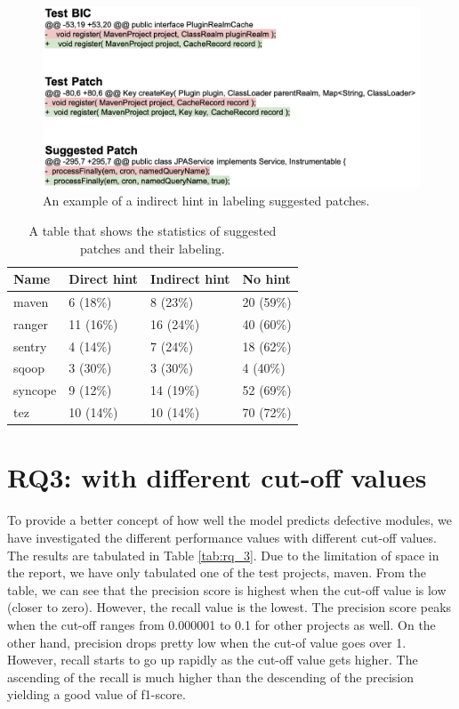 \begin{figure}[!tbp]
\renewcommand{\arraystretch}{1}
    \centering
    \includegraphics[width=\textwidth]{figures/indirect_hint.png}\hfill
    \caption{An example of a indirect hint in labeling suggested patches.}
    \label{fig:indirect_hint}
\end{figure}

\begin{table}[!htp]
\centering
\caption{A table that shows the statistics of suggested patches and their labeling.}
\begin{tabular}{|l|l|l|l|}
\hline
{Name} & {Direct hint} & {Indirect hint} & {No hint} \\ \hline
{maven} & 6 (18\%) & 8 (23\%) & 20 (59\%) \\ \hline
{ranger} & 11 (16\%) & 16 (24\%) & 40 (60\%) \\ \hline
{sentry} & 4 (14\%) & 7 (24\%) & 18 (62\%) \\ \hline
{sqoop} & 3 (30\%) & 3 (30\%) & 4 (40\%) \\ \hline
{syncope} & 9 (12\%) & 14 (19\%) & 52 (69\%) \\ \hline
{tez} & 10 (14\%) & 10 (14\%) & 70 (72\%) \\ \hline
\end{tabular}%
\label{tab:rq_2}
\end{table}


\section{RQ3: {\simfinmo} with different cut-off values}
To provide a better concept of how well the model {\simfinmo} predicts defective modules, we have investigated the different performance values with different cut-off values.
The results are tabulated in Table \ref{tab:rq_3}.
Due to the limitation of space in the report, we have only tabulated one of the test projects, maven.
From the table, we can see that the precision score is highest when the cut-off value is low (closer to zero).
However, the recall value is the lowest.
The precision score peaks when the cut-off ranges from 0.000001 to 0.1 for other projects as well.
On the other hand, precision drops pretty low when the cut-of value goes over 1.
However, recall starts to go up rapidly as the cut-off value gets higher.
The ascending of the recall is much higher than the descending of the precision yielding a good value of f1-score. 

